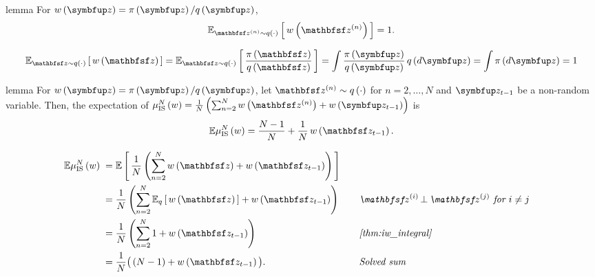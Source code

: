 \begin{theoremEnd}{lemma}\label{thm:iw_integral}
  For \(w\left(\vz\right) = \pi\left(\vz\right)/q\left(\vz\right)\),
  \begin{align*}
    \Esub{\rvvz^{(n)} \sim q\left(\cdot\right)}{
      w\left(\rvvz^{(n)}\right) 
    }
    = 1.
  \end{align*}
\end{theoremEnd}
\begin{proofEnd}
  \begin{align*}
    \Esub{\rvvz \sim q\left(\cdot\right)}{
      w\left(\rvvz\right) 
    }
    =
    \Esub{\rvvz \sim q\left(\cdot\right)}{
      \frac{\pi\left(\rvvz\right)}{q\left(\rvvz\right)}
    }
    = 
    \int 
    \frac{\pi\left(\vz\right)}{q\left(\vz\right)}
    \, q\left(d\vz\right)
    = 
    \int 
    \pi\left(d\vz\right)
    =
    1
  \end{align*}
\end{proofEnd}

\begin{theoremEnd}{lemma}\label{thm:iw_bound}
  For \(w\left(\vz\right) = \pi\left(\vz\right)/q\left(\vz\right)\), let \(\rvvz^{(n)} \sim q\left(\cdot\right)\) for \(n=2, \ldots, N\) and \(\vz_{t-1}\) be a non-random variable.
  Then, the expectation of \( \mu_{\mathrm{IS}}^N\left(w\right) = \frac{1}{N}\left(\sum^N_{n=2} w\left(\rvvz^{(n)}\right) + w\left(\vz_{t-1}\right) \right)\) is 
  \begin{align*}
    \mathbb{E}{
      \mu_{\mathrm{IS}}^N\left(w\right)
    }
    = \frac{N-1}{N} + \frac{1}{N} \, w\left(\rvvz_{t-1}\right).
  \end{align*}
\end{theoremEnd}
\begin{proofEnd}
  \begin{alignat}{2}
    \mathbb{E}{
      \mu_{\mathrm{IS}}^N\left(w\right)
    }
    &\;=
    \E{
      \frac{1}{N} \left( \sum^N_{n=2}
        w\left(\rvvz\right) 
        + w\left(\rvvz_{t-1}\right) \right)
    }
    \nonumber
    \\
    &\;=
    \frac{1}{N} \left( \sum^N_{n=2}  \Esub{q}{
      w\left(\rvvz\right) 
    }
    + w\left(\rvvz_{t-1}\right) \right)
    &&\quad\text{\textit{\(\rvvz^{(i)} \,\bot\, \rvvz^{(j)}\) for \(i \neq j\)}}
    \nonumber
    \\
    &\;=
    \frac{1}{N}
    \left(
    \sum^N_{n=2} 1
    + w\left(\rvvz_{t-1}\right) 
    \right)
    \nonumber
    &&\quad\text{\textit{\cref{thm:iw_integral}}}
    \\
    &\;=
    \frac{1}{N}
    \big(
    \left(N-1\right) + w\left(\rvvz_{t-1}\right) 
    \big).
    \nonumber
    &&\quad\text{\textit{Solved sum}}
  \end{alignat}
\end{proofEnd}

